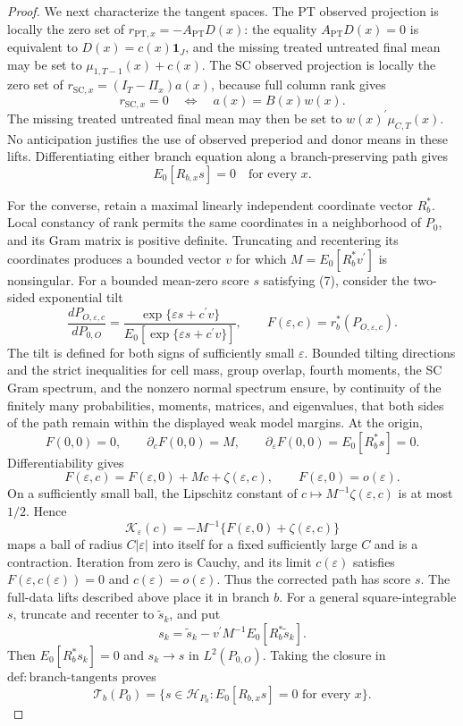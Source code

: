 \documentclass{article}
\begin{document}
\begin{proof}
We next characterize the tangent spaces.  The PT observed projection is locally the zero set of \(r_{\mathrm{PT},x}=-A_{\mathrm{PT}}D(x)\): the equality \(A_{\mathrm{PT}}D(x)=0\) is equivalent to \(D(x)=c(x)\mathbf 1_J\), and the missing treated untreated final mean may be set to \(\mu_{1,T-1}(x)+c(x)\).  The SC observed projection is locally the zero set of \(r_{\mathrm{SC},x}=(I_T-\Pi_x)a(x)\), because full column rank gives
\[
 r_{\mathrm{SC},x}=0
 \quad\Longleftrightarrow\quad
 a(x)=B(x)w(x).
 \tag{6}
\]
The missing treated untreated final mean may then be set to \(w(x)^{\prime}\mu_{C,T}(x)\).  No anticipation justifies the use of observed preperiod and donor means in these lifts.  Differentiating either branch equation along a branch-preserving path gives
\[
 E_0[R_{b,x}s]=0
 \quad\text{for every }x.
 \tag{7}
\]

For the converse, retain a maximal linearly independent coordinate vector \(R_b^*\).  Local constancy of rank permits the same coordinates in a neighborhood of \(P_0\), and its Gram matrix is positive definite.  Truncating and recentering its coordinates produces a bounded vector \(v\) for which \(M=E_0[R_b^*v^{\prime}]\) is nonsingular.  For a bounded mean-zero score \(s\) satisfying (7), consider the two-sided exponential tilt
\[
 \frac{dP_{O,\varepsilon,c}}{dP_{0,O}}
 =\frac{\exp\{\varepsilon s+c^{\prime}v\}}
 {E_0[\exp\{\varepsilon s+c^{\prime}v\}]},
 \qquad
 F(\varepsilon,c)=r_b^*(P_{O,\varepsilon,c}).
 \tag{8}
\]
The tilt is defined for both signs of sufficiently small \(\varepsilon\).  Bounded tilting directions and the strict inequalities for cell mass, group overlap, fourth moments, the SC Gram spectrum, and the nonzero normal spectrum ensure, by continuity of the finitely many probabilities, moments, matrices, and eigenvalues, that both sides of the path remain within the displayed weak model margins.  At the origin,
\[
 F(0,0)=0,
 \qquad
 \partial_cF(0,0)=M,
 \qquad
 \partial_{\varepsilon}F(0,0)=E_0[R_b^*s]=0.
 \tag{9}
\]
Differentiability gives
\[
 F(\varepsilon,c)=F(\varepsilon,0)+Mc+\zeta(\varepsilon,c),
 \qquad
 F(\varepsilon,0)=o(\varepsilon).
\]
On a sufficiently small ball, the Lipschitz constant of \(c\mapsto M^{-1}\zeta(\varepsilon,c)\) is at most \(1/2\).  Hence
\[
 \mathcal K_{\varepsilon}(c)
 =-M^{-1}\{F(\varepsilon,0)+\zeta(\varepsilon,c)\}
\]
maps a ball of radius \(C|\varepsilon|\) into itself for a fixed sufficiently large \(C\) and is a contraction.  Iteration from zero is Cauchy, and its limit \(c(\varepsilon)\) satisfies \(F(\varepsilon,c(\varepsilon))=0\) and \(c(\varepsilon)=o(\varepsilon)\).  Thus the corrected path has score \(s\).  The full-data lifts described above place it in branch \(b\).  For a general square-integrable \(s\), truncate and recenter to \(\widetilde s_k\), and put
\[
 s_k=\widetilde s_k-v^{\prime}M^{-1}E_0[R_b^*\widetilde s_k].
 \tag{10}
\]
Then \(E_0[R_b^*s_k]=0\) and \(s_k\to s\) in \(L^2(P_{0,O})\).  Taking the closure in \(\mathrm{def{:}branch\text{-}tangents}\) proves
\[
 \mathcal T_b(P_0)
 =\{s\in\mathcal H_{P_0}:E_0[R_{b,x}s]=0\text{ for every }x\}.
 \tag{11}
\]


\end{proof}
\end{document}
